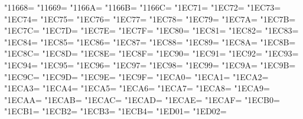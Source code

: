 \XeTeXcharclass"11668=\KclassArabU
\XeTeXcharclass"11669=\KclassArabU
\XeTeXcharclass"1166A=\KclassArabU
\XeTeXcharclass"1166B=\KclassArabU
\XeTeXcharclass"1166C=\KclassArabU
\XeTeXcharclass"1EC71=\KclassArabU
\XeTeXcharclass"1EC72=\KclassArabU
\XeTeXcharclass"1EC73=\KclassArabU
\XeTeXcharclass"1EC74=\KclassArabU
\XeTeXcharclass"1EC75=\KclassArabU
\XeTeXcharclass"1EC76=\KclassArabU
\XeTeXcharclass"1EC77=\KclassArabU
\XeTeXcharclass"1EC78=\KclassArabU
\XeTeXcharclass"1EC79=\KclassArabU
\XeTeXcharclass"1EC7A=\KclassArabU
\XeTeXcharclass"1EC7B=\KclassArabU
\XeTeXcharclass"1EC7C=\KclassArabU
\XeTeXcharclass"1EC7D=\KclassArabU
\XeTeXcharclass"1EC7E=\KclassArabU
\XeTeXcharclass"1EC7F=\KclassArabU
\XeTeXcharclass"1EC80=\KclassArabU
\XeTeXcharclass"1EC81=\KclassArabU
\XeTeXcharclass"1EC82=\KclassArabU
\XeTeXcharclass"1EC83=\KclassArabU
\XeTeXcharclass"1EC84=\KclassArabU
\XeTeXcharclass"1EC85=\KclassArabU
\XeTeXcharclass"1EC86=\KclassArabU
\XeTeXcharclass"1EC87=\KclassArabU
\XeTeXcharclass"1EC88=\KclassArabU
\XeTeXcharclass"1EC89=\KclassArabU
\XeTeXcharclass"1EC8A=\KclassArabU
\XeTeXcharclass"1EC8B=\KclassArabU
\XeTeXcharclass"1EC8C=\KclassArabU
\XeTeXcharclass"1EC8D=\KclassArabU
\XeTeXcharclass"1EC8E=\KclassArabU
\XeTeXcharclass"1EC8F=\KclassArabU
\XeTeXcharclass"1EC90=\KclassArabU
\XeTeXcharclass"1EC91=\KclassArabU
\XeTeXcharclass"1EC92=\KclassArabU
\XeTeXcharclass"1EC93=\KclassArabU
\XeTeXcharclass"1EC94=\KclassArabU
\XeTeXcharclass"1EC95=\KclassArabU
\XeTeXcharclass"1EC96=\KclassArabU
\XeTeXcharclass"1EC97=\KclassArabU
\XeTeXcharclass"1EC98=\KclassArabU
\XeTeXcharclass"1EC99=\KclassArabU
\XeTeXcharclass"1EC9A=\KclassArabU
\XeTeXcharclass"1EC9B=\KclassArabU
\XeTeXcharclass"1EC9C=\KclassArabU
\XeTeXcharclass"1EC9D=\KclassArabU
\XeTeXcharclass"1EC9E=\KclassArabU
\XeTeXcharclass"1EC9F=\KclassArabU
\XeTeXcharclass"1ECA0=\KclassArabU
\XeTeXcharclass"1ECA1=\KclassArabU
\XeTeXcharclass"1ECA2=\KclassArabU
\XeTeXcharclass"1ECA3=\KclassArabU
\XeTeXcharclass"1ECA4=\KclassArabU
\XeTeXcharclass"1ECA5=\KclassArabU
\XeTeXcharclass"1ECA6=\KclassArabU
\XeTeXcharclass"1ECA7=\KclassArabU
\XeTeXcharclass"1ECA8=\KclassArabU
\XeTeXcharclass"1ECA9=\KclassArabU
\XeTeXcharclass"1ECAA=\KclassArabU
\XeTeXcharclass"1ECAB=\KclassArabU
\XeTeXcharclass"1ECAC=\KclassArabU
\XeTeXcharclass"1ECAD=\KclassArabU
\XeTeXcharclass"1ECAE=\KclassArabU
\XeTeXcharclass"1ECAF=\KclassArabU
\XeTeXcharclass"1ECB0=\KclassArabU
\XeTeXcharclass"1ECB1=\KclassArabU
\XeTeXcharclass"1ECB2=\KclassArabU
\XeTeXcharclass"1ECB3=\KclassArabU
\XeTeXcharclass"1ECB4=\KclassArabU
\XeTeXcharclass"1ED01=\KclassArabU
\XeTeXcharclass"1ED02=\KclassArabU

